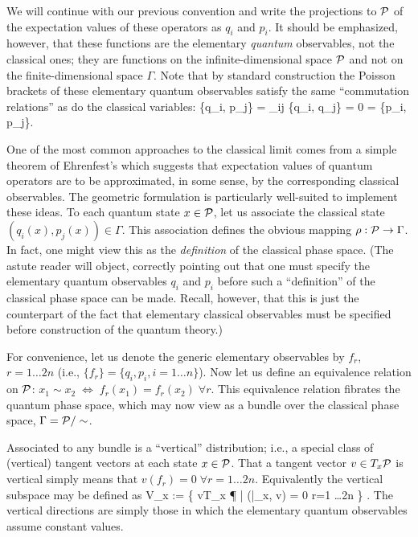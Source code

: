 We will continue with our previous convention and write the
projections to $\P$ of the expectation values of these operators as
$q_i$ and $p_i$. It should be emphasized, however, that these
functions are the elementary {\em quantum} observables, not the
classical ones; they are functions on the infinite-dimensional space
$\P$ and not on the finite-dimensional space $\Gamma$. Note that by
standard construction the Poisson brackets of these elementary quantum
observables satisfy the same ``commutation relations'' as do the
classical variables:
%
\be \{q_i,
p_j\} = \delta_{ij}  \quad \{q_i, q_j\} = 0 = \{p_i,
p_j\}.  
\ee
%

One of the most common approaches to the classical limit comes from a
simple theorem of Ehrenfest's which suggests that expectation values of
quantum operators are to be approximated, in some sense, by the
corresponding classical observables.  The geometric formulation is
particularly well-suited to implement these ideas.  To each
quantum state $x\in\P$, let us associate the classical state $(q_i(x),
p_j(x)) \in \Gamma$.  This association defines the obvious mapping
$\rho:\P \rightarrow \Gamma$.  In fact, one might view this as the
{\em definition} of the classical phase space.  (The astute reader will
object, correctly pointing out that one must specify the elementary
quantum observables $q_i$ and $p_i$ before such a ``definition'' of
the classical phase space can be made. Recall, however, that this is
just the counterpart of the fact that elementary classical observables
must be specified before construction of the quantum theory.)

For convenience, let us denote the generic elementary observables by
$f_r$, $r=1 \ldots 2n$ (i.e., $\{f_r\} = \{q_i, p_i, i=1 \ldots n\}$).
Now let us define an equivalence relation on $\P$: $x_1 \sim x_2 \;
\iff \; f_r(x_1)=f_r(x_2) \; \forall r$.  This equivalence relation
fibrates the quantum phase space, which may now view as a bundle over the
classical phase space, $\Gamma = \P/\sim$.

Associated to any bundle is a ``vertical'' distribution; i.e., a
special class of (vertical) tangent vectors at each state $x\in\P$.
That a tangent vector $v \in T_x\P$ is vertical simply means that
$v(f_r) = 0 \; \forall r=1 \ldots 2n$.  Equivalently the vertical
subspace may be defined as
%
\be
{\cal V}_x := \big\{ v\in T_x \P \; \big| \;
\w(|_x, \; v) = 0 \; \forall r=1 \ldots 2n \big\} .
\ee
%
The vertical directions are simply those in which the elementary
quantum observables assume constant values.

